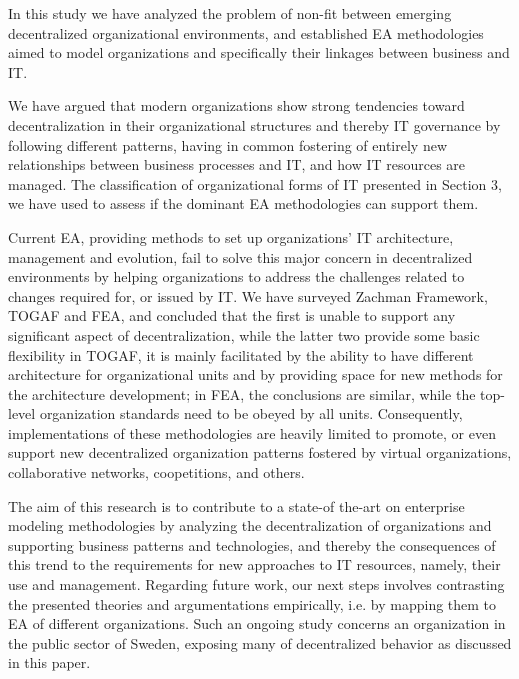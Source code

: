 In this study we have analyzed the problem of non-fit between emerging decentralized organizational environments, and established EA methodologies aimed to model organizations and specifically their linkages between business and IT. 

We have argued that modern organizations show strong tendencies toward decentralization in their organizational structures and thereby IT governance by following different patterns, having in common fostering of entirely new relationships between business processes and IT, and how IT resources are managed. The classification of organizational forms of IT presented in Section 3, we have used to assess if the dominant EA methodologies can support them.

Current EA, providing methods to set  up organizations' IT architecture, management and evolution, fail to solve this major concern in decentralized environments by helping organizations  to address  the
challenges related  to changes required  for, or issued by IT. We have surveyed Zachman Framework, TOGAF and FEA, and concluded that the first is unable to support any significant aspect of decentralization, while the latter two provide some basic flexibility in TOGAF, it is mainly facilitated by the ability to have different architecture for organizational units and by providing  space for new methods for the architecture development; in FEA, the conclusions are similar,  while the top- level organization  standards need to be obeyed by all units. Consequently, implementations of these methodologies are heavily limited to promote, or even support new decentralized organization patterns fostered by virtual organizations, collaborative networks, coopetitions, and others.

The aim of this research is to contribute to a state-of the-art on enterprise modeling methodologies by analyzing the decentralization of organizations and supporting business patterns and technologies, and thereby the consequences of this trend to the requirements  for new approaches  to IT resources,  namely, their use  and management. Regarding future work, our next steps involves contrasting the presented theories and argumentations empirically, i.e. by mapping them to EA of different organizations.  Such an ongoing study concerns an organization in the public sector of Sweden, exposing many of decentralized behavior as discussed in this paper.